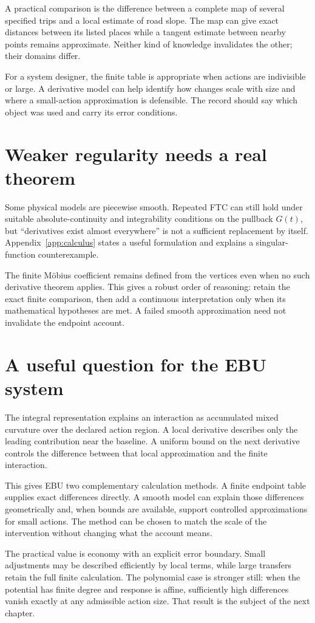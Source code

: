 A practical comparison is the difference between a complete map of several specified trips and a local estimate of road slope. The map can give exact distances between its listed places while a tangent estimate between nearby points remains approximate. Neither kind of knowledge invalidates the other; their domains differ.

For a system designer, the finite table is appropriate when actions are indivisible or large. A derivative model can help identify how changes scale with size and where a small-action approximation is defensible. The record should say which object was used and carry its error conditions.

\section{Weaker regularity needs a real theorem}
Some physical models are piecewise smooth. Repeated FTC can still hold under suitable absolute-continuity and integrability conditions on the pullback $G(t)$, but ``derivatives exist almost everywhere'' is not a sufficient replacement by itself. Appendix~\ref{app:calculus} states a useful formulation and explains a singular-function counterexample.

The finite Möbius coefficient remains defined from the vertices even when no such derivative theorem applies. This gives a robust order of reasoning: retain the exact finite comparison, then add a continuous interpretation only when its mathematical hypotheses are met. A failed smooth approximation need not invalidate the endpoint account.

\section{A useful question for the EBU system}
The integral representation explains an interaction as accumulated mixed curvature over the declared action region. A local derivative describes only the leading contribution near the baseline. A uniform bound on the next derivative controls the difference between that local approximation and the finite interaction.

This gives EBU two complementary calculation methods. A finite endpoint table supplies exact differences directly. A smooth model can explain those differences geometrically and, when bounds are available, support controlled approximations for small actions. The method can be chosen to match the scale of the intervention without changing what the account means.

The practical value is economy with an explicit error boundary. Small adjustments may be described efficiently by local terms, while large transfers retain the full finite calculation. The polynomial case is stronger still: when the potential has finite degree and response is affine, sufficiently high differences vanish exactly at any admissible action size. That result is the subject of the next chapter.
